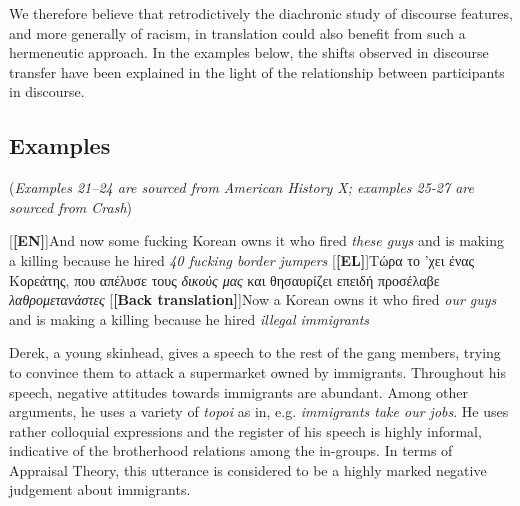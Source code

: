 \documentclass[output=paper]{LSP/langsci}
\begin{document}
We therefore believe that retrodictively \citep{Wright1971,Chesterman2008} the diachronic study of discourse features, and more generally of racism, in translation could also benefit from such a hermeneutic approach. In the examples below, the shifts observed in discourse transfer have been explained in the light of the relationship between participants in discourse.

\subsection{Examples} \label{sec:2:5:1} 
(\textit{Examples 21--24 are sourced from American History X; examples 25-27 are sourced from Crash})

\ea \label{ex:2:21}
\begin{xlist}
\exi{}[\textbf{[EN]}]{And now some fucking Korean owns it who fired \emph{these guys} and is making a killing because he hired \emph{40 fucking border jumpers}}
\exi{}[\textbf{[EL]}]{Τώρα το 'χει ένας Κορεάτης, που απέλυσε τους \emph{δικούς μας} και θησαυρίζει επειδή προσέλαβε \emph{λαθρομετανάστες}}
\exi{}[\textbf{[Back translation]}]{Now a Korean owns it who fired \emph{our guys }and is making a killing because he hired \emph{illegal immigrants}}
\end{xlist}
\z

Derek, a young skinhead, gives a speech to the rest of the gang members, trying to convince them to attack a supermarket owned by immigrants. Throughout his speech, negative attitudes towards immigrants are abundant. Among other arguments, he uses a variety of \textit{topoi} as in, e.g. \textit{immigrants take our jobs}. He uses rather colloquial expressions and the register of his speech is highly informal, indicative of the brotherhood relations among the in-groups. In terms of Appraisal Theory, this utterance is considered to be a highly marked negative judgement about immigrants.
\end{document}
